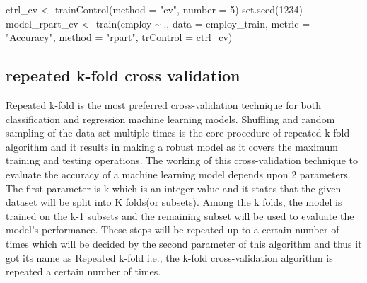 \documentclass[
]{book}
\newenvironment{Shaded}{\begin{snugshade}}{\end{snugshade}}
\newcommand{\AttributeTok}[1]{\textcolor[rgb]{0.77,0.63,0.00}{#1}}
\newcommand{\DecValTok}[1]{\textcolor[rgb]{0.00,0.00,0.81}{#1}}
\newcommand{\FunctionTok}[1]{\textcolor[rgb]{0.00,0.00,0.00}{#1}}
\newcommand{\NormalTok}[1]{#1}
\newcommand{\OtherTok}[1]{\textcolor[rgb]{0.56,0.35,0.01}{#1}}
\newcommand{\SpecialCharTok}[1]{\textcolor[rgb]{0.00,0.00,0.00}{#1}}
\newcommand{\StringTok}[1]{\textcolor[rgb]{0.31,0.60,0.02}{#1}}
\begin{document}
\begin{Shaded}
\begin{Highlighting}[]
\NormalTok{ctrl\_cv }\OtherTok{\textless{}{-}} \FunctionTok{trainControl}\NormalTok{(}\AttributeTok{method =} \StringTok{"cv"}\NormalTok{, }\AttributeTok{number =} \DecValTok{5}\NormalTok{)}
\FunctionTok{set.seed}\NormalTok{(}\DecValTok{1234}\NormalTok{)}
\NormalTok{model\_rpart\_cv }\OtherTok{\textless{}{-}} \FunctionTok{train}\NormalTok{(employ }\SpecialCharTok{\textasciitilde{}}\NormalTok{ .,}
                           \AttributeTok{data =}\NormalTok{ employ\_train,}
                           \AttributeTok{metric =} \StringTok{"Accuracy"}\NormalTok{,}
                           \AttributeTok{method =} \StringTok{"rpart"}\NormalTok{,}
                           \AttributeTok{trControl =}\NormalTok{ ctrl\_cv)}
\end{Highlighting}
\end{Shaded}

\hypertarget{repeated-k-fold-cross-validation}{%
\subsection{repeated k-fold cross validation}\label{repeated-k-fold-cross-validation}}

Repeated k-fold is the most preferred cross-validation technique for both classification and regression machine learning models. Shuffling and random sampling of the data set multiple times is the core procedure of repeated k-fold algorithm and it results in making a robust model as it covers the maximum training and testing operations. The working of this cross-validation technique to evaluate the accuracy of a machine learning model depends upon 2 parameters. The first parameter is k which is an integer value and it states that the given dataset will be split into K folds(or subsets). Among the k folds, the model is trained on the k-1 subsets and the remaining subset will be used to evaluate the model's performance. These steps will be repeated up to a certain number of times which will be decided by the second parameter of this algorithm and thus it got its name as Repeated k-fold i.e., the k-fold cross-validation algorithm is repeated a certain number of times.
\end{document}
